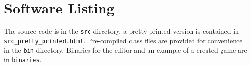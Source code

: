 \section{Software Listing}

The source code is in the \texttt{src} directory,  a pretty printed version is contained in \lstinline{src_pretty_printed.html}. Pre-compiled class files are provided for convenience in the \texttt{bin} directory.  Binaries for the editor and an example of a created game are in \texttt{binaries}.
